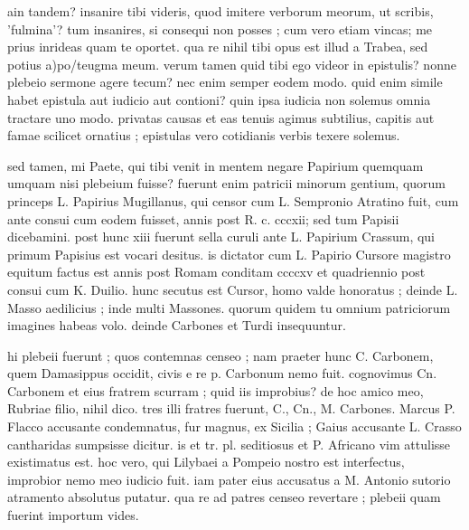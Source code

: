 


 ain tandem? insanire tibi videris, quod imitere verborum meorum, ut scribis, 'fulmina'? tum insanires, si consequi non posses ; cum vero etiam vincas; me prius inrideas quam te oportet. qua re nihil tibi opus est illud a Trabea, sed potius a)po/teugma meum. verum tamen quid tibi ego videor in epistulis? nonne plebeio sermone agere tecum? nec enim semper eodem modo. quid enim simile habet epistula aut iudicio aut contioni? quin ipsa iudicia non solemus omnia tractare uno modo. privatas causas et eas tenuis agimus subtilius, capitis aut famae scilicet ornatius ; epistulas vero cotidianis verbis texere solemus.

 sed tamen, mi Paete, qui tibi venit in mentem negare Papirium quemquam umquam nisi plebeium fuisse? fuerunt enim patricii minorum gentium, quorum princeps L. Papirius Mugillanus, qui censor cum L. Sempronio Atratino fuit, cum ante consui cum eodem fuisset, annis post R. c. cccxii; sed tum Papisii dicebamini. post hunc xiii fuerunt sella curuli ante L. Papirium Crassum, qui primum Papisius est vocari desitus. is dictator cum L. Papirio Cursore magistro equitum factus est annis post Romam conditam ccccxv et quadriennio post consui cum K. Duilio. hunc secutus est Cursor, homo valde honoratus ; deinde L. Masso aedilicius ; inde multi Massones. quorum quidem tu omnium patriciorum imagines habeas volo. deinde Carbones et Turdi insequuntur.

 hi plebeii fuerunt ; quos contemnas censeo ; nam praeter hunc C. Carbonem, quem Damasippus occidit, civis e re p. Carbonum nemo fuit. cognovimus Cn. Carbonem et eius fratrem scurram ; quid iis improbius? de hoc amico meo, Rubriae filio, nihil dico. tres illi fratres fuerunt, C., Cn., M. Carbones. Marcus P. Flacco accusante condemnatus, fur magnus, ex Sicilia ; Gaius accusante L. Crasso cantharidas sumpsisse dicitur. is et tr. pl. seditiosus et P. Africano vim attulisse existimatus est. hoc vero, qui Lilybaei a Pompeio nostro est interfectus, improbior nemo meo iudicio fuit. iam pater eius accusatus a M. Antonio sutorio atramento absolutus putatur. qua re ad patres censeo revertare ; plebeii quam fuerint importum vides.
